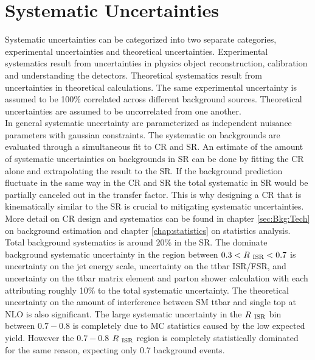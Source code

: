 
\chapter{Systematic Uncertainties}
\label{chap:Uncertainties}

\indent Systematic uncertainties can be categorized into two separate categories, experimental uncertainties and theoretical uncertainties.  Experimental systematics result from uncertainties in physics object reconstruction, calibration and understanding the detectors.  Theoretical systematics result from uncertainties in theoretical calculations. The same experimental uncertainty is assumed to be 100\% correlated across different background sources.  Theoretical uncertainties are assumed to be uncorrelated from one another.  \\

\indent In general systematic uncertainty are parameterized as independent nuisance parameters with gaussian constraints.  The systematic on backgrounds are evaluated through a simultaneous fit to CR and SR.  An estimate of the amount of systematic uncertainties on backgrounds in SR can be done by fitting the CR alone and extrapolating the result to the SR.  If the background prediction fluctuate in the same way in the CR and SR the total systematic in SR would be partially canceled out in the transfer factor.  This is why designing a CR that is kinematically similar to the SR is crucial to mitigating systematic uncertainties.  More detail on CR design and systematics can be found in chapter \ref{sec:Bkg:Tech} on background estimation and chapter \ref{chap:statistics} on statistics analysis.  \\

\indent Total background systematics is around $20\%$ in the SR.  The dominate background systematic uncertainty in the region between $0.3 < R_{~\mathrm{ISR}} < 0.7$ is uncertainty on the jet energy scale, uncertainty on the ttbar ISR/FSR, and uncertainty on the ttbar matrix element and parton shower calculation with each attributing roughly 10\% to the total systematic uncertainty.  The theoretical uncertainty on the amount of interference between SM ttbar and single top at NLO is also significant.  The large systematic uncertainty in the $R_{~\mathrm{ISR}}$ bin between $0.7-0.8$ is completely due to MC statistics caused by the low expected yield.  However the $0.7-0.8$ $R_{~\mathrm{ISR}}$ region is completely statistically dominated for the same reason, expecting only 0.7 background events.  \\


